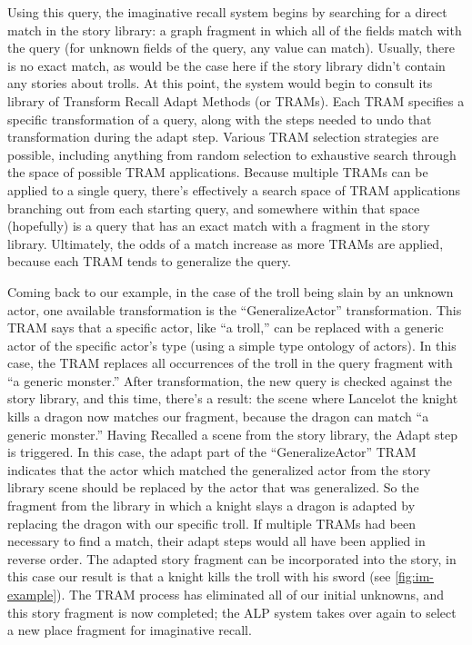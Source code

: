 Using this query, the imaginative recall system begins by searching for a direct match in the story library: a graph fragment in which all of the fields match with the query (for unknown fields of the query, any value can match).
%
Usually, there is no exact match, as would be the case here if the story library didn't contain any stories about trolls.
%
At this point, the system would begin to consult its library of Transform Recall Adapt Methods (or TRAMs).
%
Each TRAM specifies a specific transformation of a query, along with the steps needed to undo that transformation during the adapt step.
%
Various TRAM selection strategies are possible, including anything from random selection to exhaustive search through the space of possible TRAM applications.
%
Because multiple TRAMs can be applied to a single query, there's effectively a search space of TRAM applications branching out from each starting query, and somewhere within that space (hopefully) is a query that has an exact match with a fragment in the story library.
%
Ultimately, the odds of a match increase as more TRAMs are applied, because each TRAM tends to generalize the query.


Coming back to our example, in the case of the troll being slain by an unknown actor, one available transformation is the ``GeneralizeActor'' transformation.
%
This TRAM says that a specific actor, like ``a troll,'' can be replaced with a generic actor of the specific actor's type (using a simple type ontology of actors).
%
In this case, the TRAM replaces all occurrences of the troll in the query fragment with ``a generic monster.''
%
After transformation, the new query is checked against the story library, and this time, there's a result: the scene where Lancelot the knight kills a dragon now matches our fragment, because the dragon can match ``a generic monster.''
%
Having Recalled a scene from the story library, the Adapt step is triggered.
%
In this case, the adapt part of the ``GeneralizeActor'' TRAM indicates that the actor which matched the generalized actor from the story library scene should be replaced by the actor that was generalized.
%
So the fragment from the library in which a knight slays a dragon is adapted by replacing the dragon with our specific troll.
%
If multiple TRAMs had been necessary to find a match, their adapt steps would all have been applied in reverse order.
%
The adapted story fragment can be incorporated into the story, in this case our result is that a knight kills the troll with his sword (see \cref{fig:im-example}).
%
The TRAM process has eliminated all of our initial unknowns, and this story fragment is now completed; the ALP system takes over again to select a new place fragment for imaginative recall.

